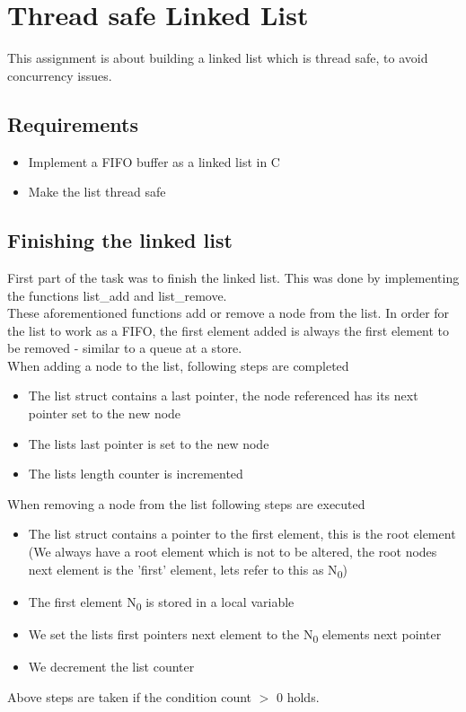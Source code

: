 \chapter{Thread safe Linked List}
This assignment is about building a linked list which is thread safe, to avoid concurrency issues.

\section{Requirements}
\begin{itemize}
\item Implement a FIFO buffer as a linked list in C
\item Make the list thread safe
\end{itemize}

\section{Finishing the linked list}
First part of the task was to finish the linked list. This was done by implementing the functions list\_add and list\_remove.\\

These aforementioned functions add or remove a node from the list. In order for the list to work as a FIFO, the first element added is always the first element to be removed - similar to a queue at a store.\\

When adding a node to the list, following steps are completed
\begin{itemize}
\item The list struct contains a last pointer, the node referenced has its next pointer set to the new node
\item The lists last pointer is set to the new node
\item The lists length counter is incremented\\
\end{itemize}

When removing a node from the list following steps are executed
\begin{itemize}
\item The list struct contains a pointer to the first element, this is the root element (We always have a root element which is not to be altered, the root nodes next element is the 'first' element, lets refer to this as N\textsubscript{0})
\item The first element N\textsubscript{0} is stored in a local variable
\item We set the lists first pointers next element to the N\textsubscript{0} elements next pointer
\item We decrement the list counter
\end{itemize}
Above steps are taken if the condition count $>$ 0 holds.\\

